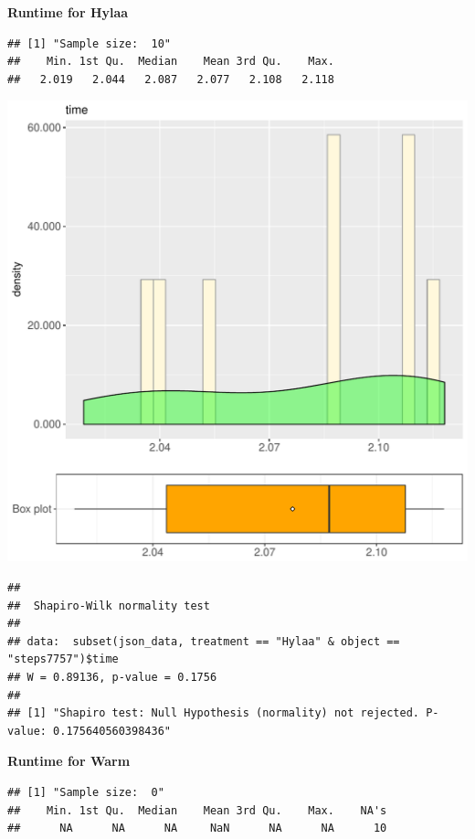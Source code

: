 \documentclass{article}\usepackage[]{graphicx}\usepackage[]{color}
\makeatletter
\def\maxwidth{ %
  \ifdim\Gin@nat@width>\linewidth
    \linewidth
  \else
    \Gin@nat@width
  \fi
}
\newenvironment{kframe}{%
 \def\at@end@of@kframe{}%
 \ifinner\ifhmode%
  \def\at@end@of@kframe{\end{minipage}}%
  \begin{minipage}{\columnwidth}%
 \fi\fi%
 \def\FrameCommand##1{\hskip\@totalleftmargin \hskip-\fboxsep
 \colorbox{shadecolor}{##1}\hskip-\fboxsep
     \hskip-\linewidth \hskip-\@totalleftmargin \hskip\columnwidth}%
 \MakeFramed {\advance\hsize-\width
   \@totalleftmargin\z@ \linewidth\hsize
   \@setminipage}}%
 {\par\unskip\endMakeFramed%
 \at@end@of@kframe}
\newenvironment{knitrout}{}{} %
\makeatother
\begin{document}
 \textbf{Runtime for Hylaa}
\begin{knitrout}
\color{fgcolor}\begin{kframe}
\begin{verbatim}
## [1] "Sample size:  10"
##    Min. 1st Qu.  Median    Mean 3rd Qu.    Max. 
##   2.019   2.044   2.087   2.077   2.108   2.118
\end{verbatim}
\end{kframe}
\includegraphics[width=\maxwidth]{figure/RH1_Hylaa_steps7757-1} 
\begin{kframe}\begin{verbatim}
## 
## 	Shapiro-Wilk normality test
## 
## data:  subset(json_data, treatment == "Hylaa" & object == "steps7757")$time
## W = 0.89136, p-value = 0.1756
## 
## [1] "Shapiro test: Null Hypothesis (normality) not rejected. P-value: 0.175640560398436"
\end{verbatim}
\end{kframe}
\end{knitrout}
 \textbf{Runtime for Warm}
\begin{knitrout}
\color{fgcolor}\begin{kframe}
\begin{verbatim}
## [1] "Sample size:  0"
##    Min. 1st Qu.  Median    Mean 3rd Qu.    Max.    NA's 
##      NA      NA      NA     NaN      NA      NA      10
\end{verbatim}
\end{kframe}
\end{knitrout}
  
\end{document}
